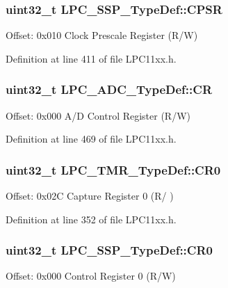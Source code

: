 \subsubsection[{\texorpdfstring{C\+P\+SR}{CPSR}}]{ uint32\+\_\+t L\+P\+C\+\_\+\+S\+S\+P\+\_\+\+Type\+Def\+::\+C\+P\+SR}\hypertarget{group___l_p_c11xx___definitions_ga454a4d1a09ccb43c3f3a8965a8b30087}{}\label{group___l_p_c11xx___definitions_ga454a4d1a09ccb43c3f3a8965a8b30087}
Offset\+: 0x010 Clock Prescale Register (R/W) 

Definition at line 411 of file L\+P\+C11xx.\+h.

\subsubsection[{\texorpdfstring{CR}{CR}}]{ uint32\+\_\+t L\+P\+C\+\_\+\+A\+D\+C\+\_\+\+Type\+Def\+::\+CR}\hypertarget{group___l_p_c11xx___definitions_ga5d9525fbad55b4d561ec1f4c8e1a6c75}{}\label{group___l_p_c11xx___definitions_ga5d9525fbad55b4d561ec1f4c8e1a6c75}
Offset\+: 0x000 A/D Control Register (R/W) 

Definition at line 469 of file L\+P\+C11xx.\+h.

\subsubsection[{\texorpdfstring{C\+R0}{CR0}}]{ uint32\+\_\+t L\+P\+C\+\_\+\+T\+M\+R\+\_\+\+Type\+Def\+::\+C\+R0}\hypertarget{group___l_p_c11xx___definitions_ga62fb131eb523de2ee3bf8c7882d7ee61}{}\label{group___l_p_c11xx___definitions_ga62fb131eb523de2ee3bf8c7882d7ee61}
Offset\+: 0x02C Capture Register 0 (R/ ) 

Definition at line 352 of file L\+P\+C11xx.\+h.

\subsubsection[{\texorpdfstring{C\+R0}{CR0}}]{ uint32\+\_\+t L\+P\+C\+\_\+\+S\+S\+P\+\_\+\+Type\+Def\+::\+C\+R0}\hypertarget{group___l_p_c11xx___definitions_ga32a68722d4e2c1b7dfc787c779a380a3}{}\label{group___l_p_c11xx___definitions_ga32a68722d4e2c1b7dfc787c779a380a3}
Offset\+: 0x000 Control Register 0 (R/W) 

